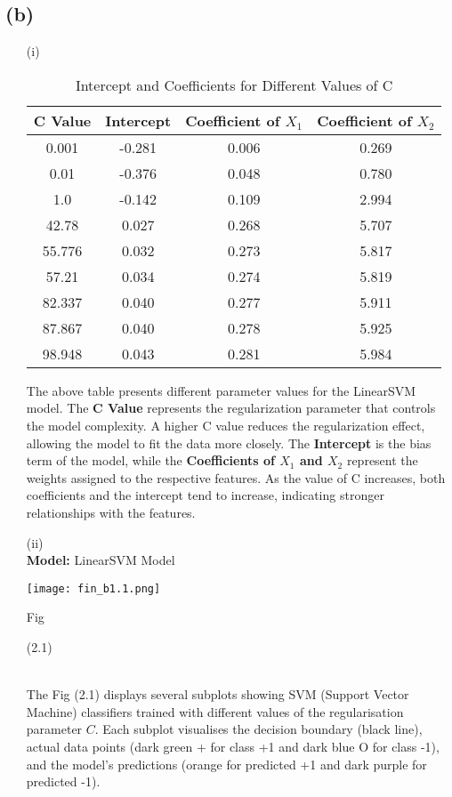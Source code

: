 \documentclass{article}
\begin{document}
\subsection*{(b)}
\begin{enumerate}
\item[(i)] \\
\begin{table}[h!]
    \centering
    \begin{tabular}{|c|c|c|c|}
        \hline
        C Value & Intercept & Coefficient of $X_1$ & Coefficient of $X_2$ \\ \hline
        0.001 & -0.281 & 0.006 & 0.269 \\ \hline
        0.01 & -0.376 & 0.048 & 0.780 \\ \hline
        1.0 & -0.142 & 0.109 & 2.994 \\ \hline
        42.78 & 0.027 & 0.268 & 5.707 \\ \hline
        55.776 & 0.032 & 0.273 & 5.817 \\ \hline
        57.21 & 0.034 & 0.274 & 5.819 \\ \hline
        82.337 & 0.040 & 0.277 & 5.911 \\ \hline
        87.867 & 0.040 & 0.278 & 5.925 \\ \hline
        98.948 & 0.043 & 0.281 & 5.984 \\ \hline
    \end{tabular}
    \caption{Intercept and Coefficients for Different Values of C}
\end{table}
The above table presents different parameter values for the LinearSVM model. The \textbf{C Value} represents the regularization parameter that controls the model complexity. A higher C value reduces the regularization effect, allowing the model to fit the data more closely. The \textbf{Intercept} is the bias term of the model, while the \textbf{Coefficients of $X_1$ and $X_2$} represent the weights assigned to the respective features. As the value of C increases, both coefficients and the intercept tend to increase, indicating stronger relationships with the features.
\newpage
\item[(ii)] \\
\textbf{Model:} LinearSVM Model \\

\begin{center}
    \texttt{[image: fin\_b1.1.png]}
    \centering
    \caption{Fig}{\centering (2.1)}
    \label{fig:enter-label}
\end{center}
  \\
     The Fig (2.1) displays several subplots showing SVM (Support Vector Machine) classifiers trained with different values of the regularisation parameter $C$. Each subplot visualises the decision boundary (black line), actual data points (dark green + for class +1 and dark blue O for class -1), and the model's predictions (orange for predicted +1 and dark purple for predicted -1). \\


\end{enumerate}
\end{document}
